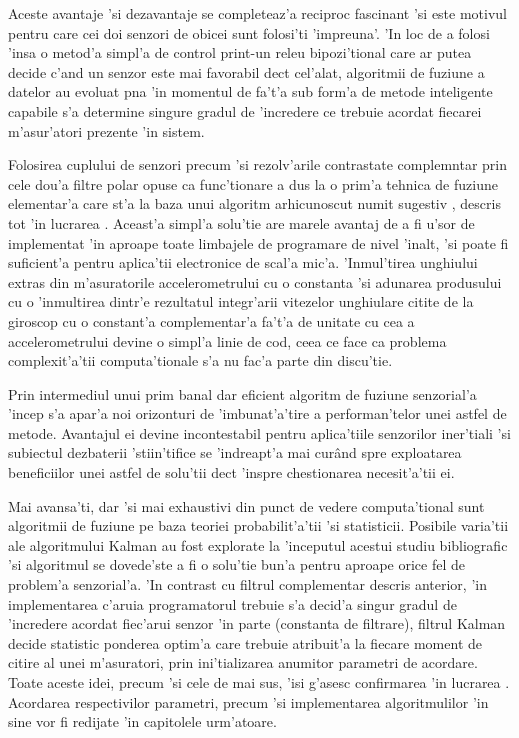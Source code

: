\documentclass[12pt,a4paper,twoside]{report}
\begin{document}
\vspace{5px}

Aceste avantaje 'si dezavantaje se completeaz'a reciproc fascinant 'si este motivul pentru care cei doi senzori de obicei sunt folosi'ti 'impreuna'. 'In loc de a folosi 'insa o metod'a simpl'a de control print-un releu bipozi'tional care ar putea decide c'and un senzor este mai favorabil dec\ia t cel'alat, algoritmii de fuziune a datelor au evoluat p\ia na 'in momentul de fa't'a sub form'a de metode inteligente capabile s'a determine singure gradul de 'incredere ce trebuie acordat fiecarei m'asur'atori prezente 'in sistem. 

\vspace{5px}

Folosirea cuplului de senzori precum 'si rezolv'arile contrastate complemntar prin cele dou'a filtre polar opuse ca func'tionare a dus la o prim'a tehnica de fuziune elementar'a care st'a la baza unui algoritm arhicunoscut numit sugestiv , descris tot 'in lucrarea \cite{7334442}. Aceast'a simpl'a solu'tie are marele avantaj de a fi u'sor de implementat 'in aproape toate limbajele de programare de nivel 'inalt, 'si poate fi suficient'a pentru aplica'tii electronice de scal'a mic'a. 'Inmul'tirea unghiului extras din m'asuratorile accelerometrului cu o constanta 'si adunarea produsului cu o 'inmultirea dintr'e rezultatul integr'arii vitezelor unghiulare citite de la giroscop cu o constant'a complementar'a fa't'a de unitate cu cea a accelerometrului devine o simpl'a linie de cod, ceea ce face ca problema complexit'a'tii computa'tionale s'a nu fac'a parte din discu'tie. 

\vspace{5px}

Prin intermediul unui prim banal dar eficient algoritm de fuziune senzorial'a 'incep s'a apar'a noi orizonturi de 'imbunat'a'tire a performan'telor unei astfel de metode. Avantajul ei devine incontestabil pentru aplica'tiile senzorilor iner'tiali 'si subiectul dezbaterii 'stiin'tifice se 'indreapt'a mai cur\^{a}nd spre exploatarea beneficiilor unei astfel de solu'tii dec\ia t 'inspre chestionarea necesit'a'tii ei.

\vspace{5px}

Mai avansa'ti, dar 'si mai exhaustivi din punct de vedere computa'tional sunt algoritmii de fuziune pe baza teoriei probabilit'a'tii 'si statisticii. Posibile varia'tii ale algoritmului Kalman au fost explorate la 'inceputul acestui studiu bibliografic 'si algoritmul se dovede'ste a fi o solu'tie bun'a pentru aproape orice fel de problem'a senzorial'a. 'In contrast cu filtrul complementar descris anterior, 'in implementarea c'aruia programatorul trebuie s'a decid'a singur gradul de 'incredere acordat fiec'arui senzor 'in parte (constanta de filtrare), filtrul Kalman decide statistic ponderea optim'a care trebuie atribuit'a la fiecare moment de citire al unei m'asuratori, prin ini'tializarea anumitor parametri de acordare. Toate aceste idei, precum 'si cele de mai sus, 'isi g'asesc confirmarea 'in lucrarea \cite{7334442}. Acordarea respectivilor parametri, precum 'si implementarea algoritmulilor 'in sine vor fi redijate 'in capitolele urm'atoare.
\end{document}
